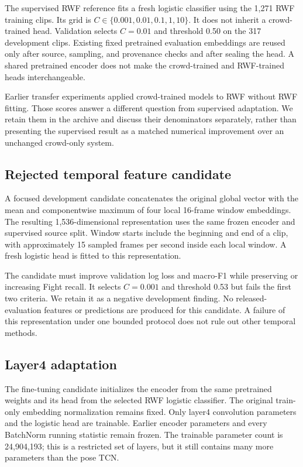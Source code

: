 The supervised RWF reference fits a fresh logistic classifier using the 1,271 RWF training clips. Its grid is $C\in\{0.001,0.01,0.1,1,10\}$. It does not inherit a crowd-trained head. Validation selects $C=0.01$ and threshold 0.50 on the 317 development clips. Existing fixed pretrained evaluation embeddings are reused only after source, sampling, and provenance checks and after sealing the head. A shared pretrained encoder does not make the crowd-trained and RWF-trained heads interchangeable.

Earlier transfer experiments applied crowd-trained models to RWF without RWF fitting. Those scores answer a different question from supervised adaptation. We retain them in the archive and discuss their denominators separately, rather than presenting the supervised result as a matched numerical improvement over an unchanged crowd-only system.

\subsection{Rejected temporal feature candidate}
A focused development candidate concatenates the original global vector with the mean and componentwise maximum of four local 16-frame window embeddings. The resulting 1,536-dimensional representation uses the same frozen encoder and supervised source split. Window starts include the beginning and end of a clip, with approximately 15 sampled frames per second inside each local window. A fresh logistic head is fitted to this representation.

The candidate must improve validation log loss and macro-F1 while preserving or increasing Fight recall. It selects $C=0.001$ and threshold 0.53 but fails the first two criteria. We retain it as a negative development finding. No released-evaluation features or predictions are produced for this candidate. A failure of this representation under one bounded protocol does not rule out other temporal methods.

\subsection{Layer4 adaptation}
The fine-tuning candidate initializes the encoder from the same pretrained weights and its head from the selected RWF logistic classifier. The original train-only embedding normalization remains fixed. Only layer4 convolution parameters and the logistic head are trainable. Earlier encoder parameters and every BatchNorm running statistic remain frozen. The trainable parameter count is 24,904,193; this is a restricted set of layers, but it still contains many more parameters than the pose TCN.

